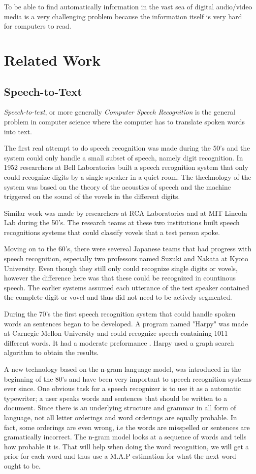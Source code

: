 \documentclass[a4paper,12pt,twoside]{ltxdoc}
\begin{document}
To be able to find automatically information in the vast sea of digital audio/video media is a very challenging problem
because the information itself is very hard for computers to read. 



\section{Related Work}
\subsection{Speech-to-Text}
\emph{Speech-to-text}, or more generally \emph{Computer Speech Recognition} is the general problem in computer science where the computer has to translate spoken words into text.

The first real attempt to do speech recognition was made during the 50's and the system could only handle a small subset of speech, namely digit recognition. In 1952 researchers at Bell Laboratories built a speech recognition system that only could recognize digits by a single speaker in a quiet room. The thechnology of  the system was based on the theory of the acoustics of speech and the machine triggered on the sound of the vovels in the different digits.

Similar work was made by researchers at RCA Laboratories and at MIT Lincoln Lab during the 50's. The research teams at these two institutions built speech recognitions systems that could classify vovels that a test person spoke.

Moving on to the 60's, there were severeal Japanese teams that had progress with speech recognition, especially two professors named Suzuki and Nakata at Kyoto University. Even though they still only could recognize single digits or vovels, however the difference here was that these could be recognized in countinous speech. The earlier systems assumed each utterance of the test speaker contained the complete digit or vovel and thus did not need to be actively segmented.  

During the 70's the first speech recognition system that could handle spoken words an sentences began to be developed. A program named "Harpy" was made at Carnegie Mellon University and could recognize speech containing 1011 different words. It had a moderate preformance . Harpy used a graph search algorithm to obtain the results. 

A new technology based on the n-gram language model, was introduced in the beginning of the 80's and have been very important to speech recognition systems ever since. One obvious task for a speech recognizer is to use it as a automatic typewriter; a user speaks words and sentences that should be written to a document. Since there is an underlying structure and grammar in all form of language, not all letter orderings and word orderings are equally probable. In fact, some orderings are even wrong, i.e the words are misspelled or sentences are gramatically incorrect. The n-gram model looks at a sequence of words and tells how probable it is. That will help when doing the word recognition, we will get a prior for each word and thus use a M.A.P estimation for what the next word ought to be.
\end{document}
